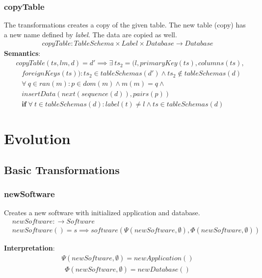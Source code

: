 \documentclass[10pt]{article}
\begin{document}
\subsubsection{copyTable}
The transformations creates a copy of the given table. The new table (copy) has a new name defined by \emph{label}. The data are copied as well.
\begin{align}
copyTable: TableSchema \times Label \times Database \rightarrow Database 
\end{align}
\noindent \textbf{Semantics}:
\begin{align}
& copyTable(ts, l m, d) = d' \implies
\exists \:  ts_2 = (l, primaryKey(ts), columns(ts), \nonumber \\
& \;\;\; foreignKeys(ts)) : ts_2 \in tableSchemas(d') \land ts_2 \notin tableSchemas(d) \nonumber \\
& \;\;\; \forall \: q \in ran(m) : p \in dom(m) \land m(m) = q \land \nonumber \\  
& \;\;\; insertData(next(sequence(d)), pairs(p))  \nonumber \\
& \;\;\; \mathbf{if} \; \forall \: t \in tableSchemas(d) : label(t) \neq l \land ts \in tableSchemas(d)
\end{align}


\section{Evolution}
\subsection{Basic Transformations}

\subsubsection{newSoftware}
Creates a new software with initialized application and database.
\begin{align}
& newSoftware: \rightarrow Software \\
& newSoftware() = s \implies software(\Psi(newSoftware, \emptyset), \Phi(newSoftware, \emptyset))
\end{align}

\noindent \textbf{Interpretation}:
\begin{align}
\Psi(newSoftware, \emptyset) = newApplication()
\end{align}
\begin{align}
\Phi(newSoftware, \emptyset) = newDatabase()
\end{align}
\end{document}

